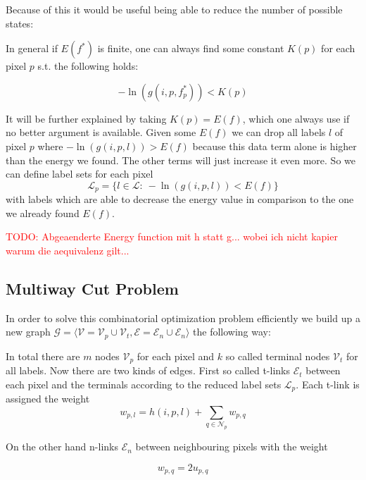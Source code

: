 \documentclass{scrartcl}[12pt, halfparskip]
\newcommand{\todo}[1]{\textcolor{red}{TODO: #1}}
\begin{document}
Because of this it would be useful being able to reduce the number of possible states:

In general if $E(f^*)$ is finite, one can always find some constant $K(p)$ for each pixel $p$ s.t. the following holds:

\begin{equation}
	- \ln(g(i, p, f_p^*)) < K(p)
\end{equation}

It will be further explained by taking $K(p) = E(f)$, which one always use if no better argument is available. Given some $E(f)$ we can drop all labels $l$ of pixel $p$ where $- \ln(g(i, p, l)) > E(f)$ because this data term alone is higher than the energy we found. The other terms will just increase it even more. So we can define label sets for each pixel
\begin{equation}
	\mathcal{L}_p = \{l \in \mathcal{L}: \ - \ln(g(i, p, l)) < E(f) \}
\end{equation}
with labels which are able to decrease the energy value in comparison to the one we already found $E(f)$.

\todo{Abgeaenderte Energy function mit h statt g... wobei ich nicht kapier warum die aequivalenz gilt...}


\subsection{Multiway Cut Problem}
In order to solve this combinatorial optimization problem efficiently we build up a new graph $\mathcal{G} = \langle \mathcal{V} = \mathcal{V}_p \cup \mathcal{V}_t, \mathcal{E} = \mathcal{E}_n \cup \mathcal{E}_n \rangle$ the following way:

In total there are $m$ nodes $\mathcal{V}_p$ for each pixel and $k$ so called terminal nodes $\mathcal{V}_t$ for all labels. Now there are two kinds of edges. First so called t-links $\mathcal{E}_t$ between each pixel and the terminals according to the reduced label sets $\mathcal{L}_p$. Each t-link is assigned the weight
\begin{equation}
	w_{p,l} = h(i,p,l) + \sum\limits_{q \in \mathcal{N}_p} w_{p,q}
\end{equation}

On the other hand n-links $\mathcal{E}_n$ between neighbouring pixels with the weight

\begin{equation}
	w_{p,q} = 2 u_{p,q}
\end{equation}
\end{document}
